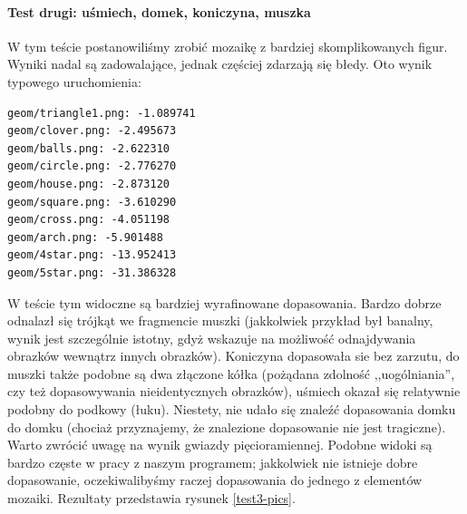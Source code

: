 \documentclass[a4paper,12pt,leqno]{article}
\begin{document}
\paragraph{Test drugi: uśmiech, domek, koniczyna, muszka}
W tym teście postanowiliśmy zrobić mozaikę z bardziej skomplikowanych figur. Wyniki nadal są zadowalające, jednak częściej zdarzają się błedy.
Oto wynik typowego uruchomienia:
\begin{verbatim}
geom/triangle1.png: -1.089741
geom/clover.png: -2.495673
geom/balls.png: -2.622310
geom/circle.png: -2.776270
geom/house.png: -2.873120
geom/square.png: -3.610290
geom/cross.png: -4.051198
geom/arch.png: -5.901488
geom/4star.png: -13.952413
geom/5star.png: -31.386328
\end{verbatim}
W teście tym widoczne są bardziej wyrafinowane dopasowania. Bardzo dobrze odnalazł się trójkąt we fragmencie muszki (jakkolwiek przykład był banalny, wynik jest szczególnie istotny,
gdyż wskazuje na możliwość odnajdywania obrazków wewnątrz innych obrazków). Koniczyna dopasowała sie bez zarzutu, do muszki także podobne są dwa złączone kółka (pożądana zdolność
,,uogólniania'', czy też dopasowywania nieidentycznych obrazków), uśmiech okazał się relatywnie podobny do podkowy (łuku). Niestety, nie udało się znaleźć dopasowania domku do domku
(chociaż przyznajemy, że znalezione dopasowanie nie jest tragiczne). Warto zwrócić uwagę na wynik gwiazdy pięcioramiennej. Podobne widoki są bardzo częste w pracy z naszym programem;
jakkolwiek nie istnieje dobre dopasowanie, oczekiwalibyśmy raczej dopasowania do jednego z elementów mozaiki. Rezultaty przedstawia rysunek \ref{test3-pics}.
\end{document}
